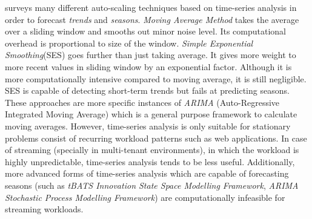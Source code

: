 \textcite{Herbst:2013} surveys many different auto-scaling techniques based on time-series analysis in order to forecast \emph{trends} and \emph{seasons}. \emph{Moving Average Method} takes the average over a sliding window and smooths out minor noise level. Its computational overhead is proportional to size of the window. \emph{Simple Exponential Smoothing}(SES) goes further than just taking average. It gives more weight to more recent values in sliding window by an exponential factor. Although it is more computationally intensive compared to moving average, it is still negligible. SES is capable of detecting short-term trends but fails at predicting seasons. These approaches are more specific instances of \emph{ARIMA} (Auto-Regressive Integrated Moving Average) which is a general purpose framework to calculate moving averages. However, time-series analysis is only suitable for stationary problems consist of recurring workload patterns such as web applications. In case of streaming (specially in multi-tenant environments), in which the workload is highly unpredictable, time-series analysis tends to be less useful. Additionally, more advanced forms of time-series analysis which are capable of forecasting seasons (such as \emph{tBATS Innovation State Space Modelling Framework}\cite{Alysha2011}, \emph{ARIMA Stochastic Process Modelling Framework}\cite{JSSv027i03}) are computationally infeasible for streaming workloads. 